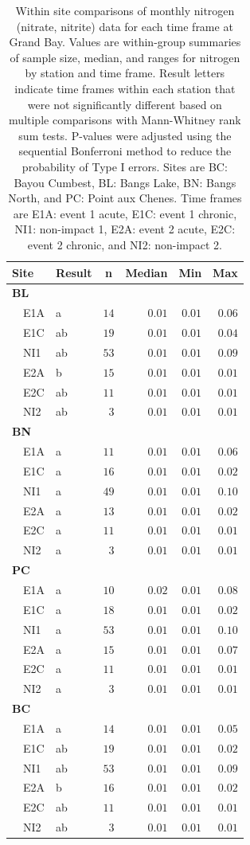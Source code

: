 \documentclass[letterpaper,12pt]{article}\usepackage[]{graphicx}\usepackage[]{color}
\begin{document}
\clearpage

\begin{table}[!tbp]
\caption{Within site comparisons  of monthly nitrogen (nitrate, nitrite) data for each time frame at Grand Bay.  Values are within-group summaries of sample size, median, and ranges for nitrogen by station and time frame.  Result letters indicate time frames within each station that were not significantly different based on multiple comparisons with Mann-Whitney rank sum tests.  P-values were adjusted using the sequential Bonferroni method to reduce the probability of Type I errors. Sites are BC: Bayou Cumbest, BL: Bangs Lake, BN: Bangs North, and PC: Point aux Chenes.  Time frames are E1A: event 1 acute, E1C: event 1 chronic, NI1: non-impact 1, E2A: event 2 acute, E2C: event 2 chronic, and NI2: non-impact 2.\label{tab:tntab}} 
\begin{center}
\begin{tabular}{llrrrr}
\hline\hline
\multicolumn{1}{l}{Site}&\multicolumn{1}{c}{Result}&\multicolumn{1}{c}{n}&\multicolumn{1}{c}{Median}&\multicolumn{1}{c}{Min}&\multicolumn{1}{c}{Max}\tabularnewline
\hline
{\bfseries BL}&&&&&\tabularnewline
~~E1A&a&$14$&$0.01$&$0.01$&$0.06$\tabularnewline
~~E1C&ab&$19$&$0.01$&$0.01$&$0.04$\tabularnewline
~~NI1&ab&$53$&$0.01$&$0.01$&$0.09$\tabularnewline
~~E2A&b&$15$&$0.01$&$0.01$&$0.01$\tabularnewline
~~E2C&ab&$11$&$0.01$&$0.01$&$0.01$\tabularnewline
~~NI2&ab&$ 3$&$0.01$&$0.01$&$0.01$\tabularnewline
\hline
{\bfseries BN}&&&&&\tabularnewline
~~E1A&a&$11$&$0.01$&$0.01$&$0.06$\tabularnewline
~~E1C&a&$16$&$0.01$&$0.01$&$0.02$\tabularnewline
~~NI1&a&$49$&$0.01$&$0.01$&$0.10$\tabularnewline
~~E2A&a&$13$&$0.01$&$0.01$&$0.02$\tabularnewline
~~E2C&a&$11$&$0.01$&$0.01$&$0.01$\tabularnewline
~~NI2&a&$ 3$&$0.01$&$0.01$&$0.01$\tabularnewline
\hline
{\bfseries PC}&&&&&\tabularnewline
~~E1A&a&$10$&$0.02$&$0.01$&$0.08$\tabularnewline
~~E1C&a&$18$&$0.01$&$0.01$&$0.02$\tabularnewline
~~NI1&a&$53$&$0.01$&$0.01$&$0.10$\tabularnewline
~~E2A&a&$15$&$0.01$&$0.01$&$0.07$\tabularnewline
~~E2C&a&$11$&$0.01$&$0.01$&$0.01$\tabularnewline
~~NI2&a&$ 3$&$0.01$&$0.01$&$0.01$\tabularnewline
\hline
{\bfseries BC}&&&&&\tabularnewline
~~E1A&a&$14$&$0.01$&$0.01$&$0.05$\tabularnewline
~~E1C&ab&$19$&$0.01$&$0.01$&$0.02$\tabularnewline
~~NI1&ab&$53$&$0.01$&$0.01$&$0.09$\tabularnewline
~~E2A&b&$16$&$0.01$&$0.01$&$0.02$\tabularnewline
~~E2C&ab&$11$&$0.01$&$0.01$&$0.01$\tabularnewline
~~NI2&ab&$ 3$&$0.01$&$0.01$&$0.01$\tabularnewline
\hline
\end{tabular}\end{center}

\end{table}
\end{document}

